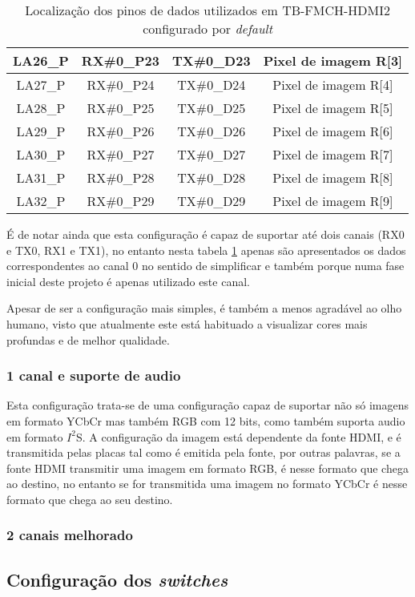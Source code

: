 \begin{table}[h!]
\begin{tabular}{|c|c|c|c|}
		LA26\_P      & RX\#0\_P23                           & TX\#0\_D23                         & Pixel de imagem R{[}3{]} \\ \hline
		LA27\_P      & RX\#0\_P24                           & TX\#0\_D24                         & Pixel de imagem R{[}4{]} \\ \hline
		LA28\_P      & RX\#0\_P25                           & TX\#0\_D25                         & Pixel de imagem R{[}5{]} \\ \hline
		LA29\_P      & RX\#0\_P26                           & TX\#0\_D26                         & Pixel de imagem R{[}6{]} \\ \hline
		LA30\_P      & RX\#0\_P27                           & TX\#0\_D27                         & Pixel de imagem R{[}7{]} \\ \hline
		LA31\_P      & RX\#0\_P28                           & TX\#0\_D28                         & Pixel de imagem R{[}8{]} \\ \hline
		LA32\_P      & RX\#0\_P29                           & TX\#0\_D29                         & Pixel de imagem R{[}9{]} \\ \hline
	\end{tabular}
	\caption{Localização dos pinos de dados utilizados em TB-FMCH-HDMI2 configurado por \textit{default}}
	\label{table:HDMIdataDefaultdetail}
\end{table}

É de notar ainda que esta configuração é capaz de suportar até dois canais (RX0 e TX0, RX1 e TX1), no entanto nesta tabela \ref{table:HDMIdataDefaultdetail} apenas são apresentados os dados correspondentes ao canal 0 no sentido de simplificar e também porque numa fase inicial deste projeto é apenas utilizado este canal.

Apesar de ser a configuração mais simples, é também a menos agradável ao olho humano, visto que atualmente este está habituado a visualizar cores mais profundas e de melhor qualidade. 

\subsubsection{1 canal e suporte de audio} \label {subsubsec:HDMIconfig+audio}

Esta configuração trata-se de uma configuração capaz de suportar não só imagens em formato YCbCr mas também RGB com 12 bits, como também suporta audio em formato $I^{2}$S. A configuração da imagem está dependente da fonte HDMI, e é transmitida pelas placas tal como é emitida pela fonte, por outras palavras, se a fonte HDMI transmitir uma imagem em formato RGB, é nesse formato que chega ao destino, no entanto se for transmitida uma imagem no formato YCbCr é nesse formato que chega ao seu destino.



\subsubsection{2 canais melhorado} \label{subsubsec:HDMIconfigMelhorado}

\subsection{Configuração dos \textit{switches}}